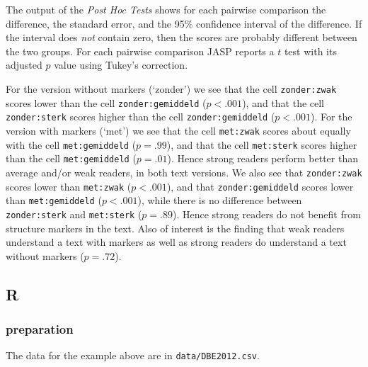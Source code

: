 \documentclass[
]{book}
\begin{document}
The output of the \emph{Post Hoc Tests} shows for each pairwise comparison the difference, the standard error, and the 95\% confidence interval of the difference. If the interval does \emph{not} contain zero, then the scores are probably different between the two groups. For each pairwise comparison JASP reports a \(t\) test with its adjusted \(p\) value using Tukey's correction.

For the version without markers (`zonder') we see that the cell \texttt{zonder:zwak} scores lower than the cell \texttt{zonder:gemiddeld} (\(p<.001\)), and that the cell \texttt{zonder:sterk} scores higher than the cell \texttt{zonder:gemiddeld} (\(p<.001\)).
For the version with markers (`met') we see that the cell \texttt{met:zwak} scores about equally with the cell \texttt{met:gemiddeld} (\(p=.99\)), and that the cell \texttt{met:sterk} scores higher than the cell \texttt{met:gemiddeld} (\(p=.01\)). Hence strong readers perform better than average and/or weak readers, in both text versions.
We also see that \texttt{zonder:zwak} scores lower than \texttt{met:zwak} (\(p<.001\)),
and that \texttt{zonder:gemiddeld} scores lower than \texttt{met:gemiddeld} (\(p<.001\)),
while there is no difference between \texttt{zonder:sterk} and \texttt{met:sterk} (\(p=.89\)).
Hence strong readers do not benefit from structure markers in the text.
Also of interest is the finding that weak readers understand a text with markers as well as strong readers do understand a text without markers (\(p=.72\)).

\hypertarget{r-16}{%
\subsection{R}\label{r-16}}

\hypertarget{preparation-5}{%
\subsubsection{preparation}\label{preparation-5}}

The data for the example above are in \texttt{data/DBE2012.csv}.
\end{document}
